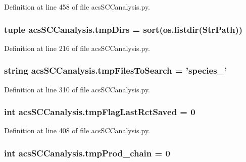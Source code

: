 Definition at line 458 of file acs\-S\-C\-Canalysis.\-py.

\hypertarget{a00128_ace4c571efd2e5ecd266ce5701f761a83}{
\subsubsection[{tmp\-Dirs}]{\setlength{\rightskip}{0pt plus 5cm}tuple acs\-S\-C\-Canalysis.\-tmp\-Dirs = sort(os.\-listdir({\bf Str\-Path}))}}\label{a00128_ace4c571efd2e5ecd266ce5701f761a83}


Definition at line 216 of file acs\-S\-C\-Canalysis.\-py.

\hypertarget{a00128_a141356fc914110fdf3ec4f0fc3beaab5}{
\subsubsection[{tmp\-Files\-To\-Search}]{\setlength{\rightskip}{0pt plus 5cm}string acs\-S\-C\-Canalysis.\-tmp\-Files\-To\-Search = 'species\-\_\-'}}\label{a00128_a141356fc914110fdf3ec4f0fc3beaab5}


Definition at line 310 of file acs\-S\-C\-Canalysis.\-py.

\hypertarget{a00128_a6e8aff976901d1424dd1ff00c3387014}{
\subsubsection[{tmp\-Flag\-Last\-Rct\-Saved}]{\setlength{\rightskip}{0pt plus 5cm}int acs\-S\-C\-Canalysis.\-tmp\-Flag\-Last\-Rct\-Saved = 0}}\label{a00128_a6e8aff976901d1424dd1ff00c3387014}


Definition at line 408 of file acs\-S\-C\-Canalysis.\-py.

\hypertarget{a00128_aee6b4f50387d471b70458cf703c0863b}{
\subsubsection[{tmp\-Prod\-\_\-chain}]{\setlength{\rightskip}{0pt plus 5cm}int acs\-S\-C\-Canalysis.\-tmp\-Prod\-\_\-chain = 0}}\label{a00128_aee6b4f50387d471b70458cf703c0863b}



